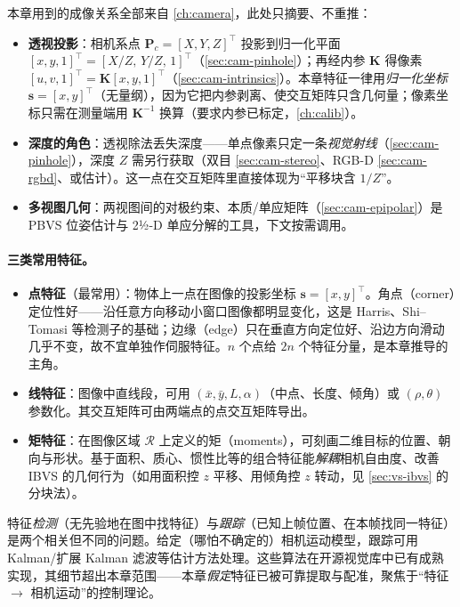 \begin{note}\label{note:vs-feature-recall}
本章用到的成像关系全部来自 \cref{ch:camera}，此处只摘要、不重推：
\begin{itemize}
  \item \textbf{透视投影}：相机系点 $\mathbf{P}_c=[X,Y,Z]^\top$ 投影到归一化平面 $[x,y,1]^\top=[X/Z,\,Y/Z,\,1]^\top$（\cref{sec:cam-pinhole}）；再经内参 $\mathbf{K}$ 得像素 $[u,v,1]^\top=\mathbf{K}[x,y,1]^\top$（\cref{sec:cam-intrinsics}）。本章特征一律用\emph{归一化坐标} $\mathbf{s}=[x,y]^\top$（无量纲），因为它把内参剥离、使交互矩阵只含几何量；像素坐标只需在测量端用 $\mathbf{K}^{-1}$ 换算（要求内参已标定，\cref{ch:calib}）。
  \item \textbf{深度的角色}：透视除法丢失深度——单点像素只定一条\emph{视觉射线}（\cref{sec:cam-pinhole}），深度 $Z$ 需另行获取（双目 \cref{sec:cam-stereo}、RGB-D \cref{sec:cam-rgbd}、或估计）。这一点在交互矩阵里直接体现为“平移块含 $1/Z$”。
  \item \textbf{多视图几何}：两视图间的对极约束、本质/单应矩阵（\cref{sec:cam-epipolar}）是 PBVS 位姿估计与 2½-D 单应分解的工具，下文按需调用。
\end{itemize}
\end{note}

\paragraph{三类常用特征。}
\begin{itemize}
  \item \textbf{点特征}（最常用）：物体上一点在图像的投影坐标 $\mathbf{s}=[x,y]^\top$。角点（corner）定位性好——沿任意方向移动小窗口图像都明显变化，这是 Harris、Shi--Tomasi 等检测子的基础\cite{spong2006robot}；边缘（edge）只在垂直方向定位好、沿边方向滑动几乎不变，故不宜单独作伺服特征。$n$ 个点给 $2n$ 个特征分量，是本章推导的主角。
  \item \textbf{线特征}：图像中直线段，可用 $(\bar x,\bar y,L,\alpha)$（中点、长度、倾角）或 $(\rho,\theta)$ 参数化\cite{siciliano2009robotics}。其交互矩阵可由两端点的点交互矩阵导出。
  \item \textbf{矩特征}：在图像区域 $\mathcal{R}$ 上定义的矩（moments），可刻画二维目标的位置、朝向与形状\cite{siciliano2009robotics}。基于面积、质心、惯性比等的组合特征能\emph{解耦}相机自由度、改善 IBVS 的几何行为（如用面积控 $z$ 平移、用倾角控 $z$ 转动，见 \cref{sec:vs-ibvs} 的分块法）。
\end{itemize}

\begin{note}\label{note:vs-tracking}
特征\emph{检测}（无先验地在图中找特征）与\emph{跟踪}（已知上帧位置、在本帧找同一特征）是两个相关但不同的问题\cite{spong2006robot}。给定（哪怕不确定的）相机运动模型，跟踪可用 Kalman/扩展 Kalman 滤波等估计方法处理。这些算法在开源视觉库中已有成熟实现，其细节超出本章范围——本章\emph{假定}特征已被可靠提取与配准，聚焦于“特征 $\to$ 相机运动”的控制理论。
\end{note}

